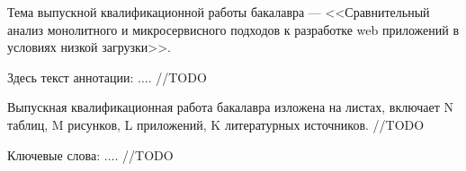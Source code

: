 
Тема выпускной квалификационной работы бакалавра --- <<Сравнительный анализ монолитного и микросервисного подходов к разработке web приложений в условиях низкой загрузки>>.

Здесь текст аннотации: $\dots$. //TODO

Выпускная квалификационная работа бакалавра изложена на \pageref{LastPage} листах, включает N таблиц, M рисунков, L приложений, K литературных источников. //TODO

Ключевые слова: $\dots$. //TODO

\clearpage